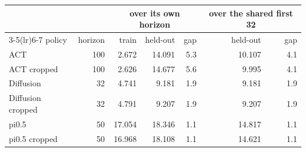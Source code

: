 \begin{tabular}{lrrrrrr}
\toprule
& & \multicolumn{3}{c}{over its own horizon} & \multicolumn{2}{c}{over the shared first 32} \\
\cmidrule(lr){3-5}\cmidrule(lr){6-7}
policy & horizon & train & held-out & gap & held-out & gap \\
\midrule
ACT & 100 & 2.672 & 14.091 & 5.3 & 10.107 & 4.1 \\
ACT cropped & 100 & 2.626 & 14.677 & 5.6 & 9.995 & 4.1 \\
Diffusion & 32 & 4.741 & 9.181 & 1.9 & 9.181 & 1.9 \\
Diffusion cropped & 32 & 4.791 & 9.207 & 1.9 & 9.207 & 1.9 \\
pi0.5 & 50 & 17.054 & 18.346 & 1.1 & 14.817 & 1.1 \\
pi0.5 cropped & 50 & 16.968 & 18.108 & 1.1 & 14.621 & 1.1 \\
\bottomrule
\end{tabular}
